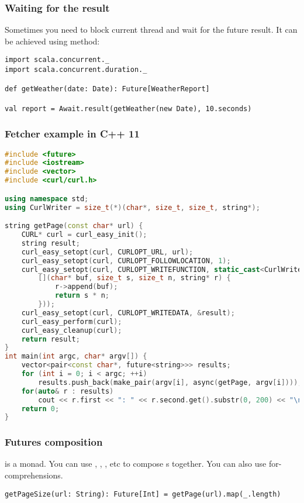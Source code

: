 \documentclass{beamer}
\begin{document}
\begin{frame}[fragile]
\frametitle{Waiting for the result}
Sometimes you need to block current thread and wait for the future result.
It can be achieved using  method:
\begin{example}
\begin{lstlisting}
import scala.concurrent._
import scala.concurrent.duration._

def getWeather(date: Date): Future[WeatherReport]

val report = Await.result(getWeather(new Date), 10.seconds)
\end{lstlisting}
\end{example}

\end{frame}

\begin{frame}[fragile]
\frametitle{Fetcher example in C++ 11}
\begin{lstlisting}[language=C++]
#include <future>
#include <iostream>
#include <vector>
#include <curl/curl.h>

using namespace std;
using CurlWriter = size_t(*)(char*, size_t, size_t, string*);

string getPage(const char* url) {
    CURL* curl = curl_easy_init();
    string result;
    curl_easy_setopt(curl, CURLOPT_URL, url);
    curl_easy_setopt(curl, CURLOPT_FOLLOWLOCATION, 1);
    curl_easy_setopt(curl, CURLOPT_WRITEFUNCTION, static_cast<CurlWriter>(
        [](char* buf, size_t s, size_t n, string* r) {
            r->append(buf);
            return s * n;
        }));
    curl_easy_setopt(curl, CURLOPT_WRITEDATA, &result);
    curl_easy_perform(curl);
    curl_easy_cleanup(curl);
    return result;
}
int main(int argc, char* argv[]) {
    vector<pair<const char*, future<string>>> results;
    for (int i = 0; i < argc; ++i)
        results.push_back(make_pair(argv[i], async(getPage, argv[i])));
    for(auto& r : results)
        cout << r.first << ": " << r.second.get().substr(0, 200) << "\n";
    return 0;
}
\end{lstlisting}
\end{frame}

\begin{frame}[fragile]
\frametitle{Futures composition}
 is a monad. You can use , , , etc to
compose s together. You can also use for-comprehensions.
\begin{lstlisting}
getPageSize(url: String): Future[Int] = getPage(url).map(_.length)
\end{lstlisting}
\end{frame}
\end{document}

